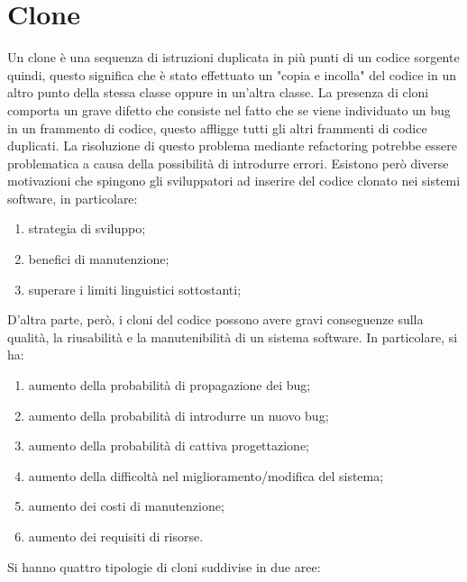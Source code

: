 \section{Clone}
Un clone è una sequenza di istruzioni duplicata in più punti di un codice sorgente quindi, questo significa che è stato effettuato un "copia e incolla" del codice in un altro punto della stessa classe oppure in un'altra classe. La presenza di cloni comporta un grave difetto che consiste nel fatto che se viene individuato un bug in un frammento di codice, questo affligge tutti gli altri frammenti di codice duplicati. La risoluzione di questo problema mediante refactoring potrebbe essere problematica a causa della possibilità di introdurre errori. Esistono però diverse motivazioni che spingono gli sviluppatori ad inserire del codice clonato nei sistemi software, in particolare:
\begin{enumerate}
\item	strategia di sviluppo;
\item	benefici di manutenzione;
\item	superare i limiti linguistici sottostanti;
\end{enumerate}
D'altra parte, però, i cloni del codice possono avere gravi conseguenze sulla qualità, la riusabilità e la manutenibilità di un sistema software. In particolare, si ha:
\begin{enumerate}
\item	aumento della probabilità di propagazione dei bug;
\item	aumento della probabilità di introdurre un nuovo bug;
\item	aumento della probabilità di cattiva progettazione;
\item	aumento della difficoltà nel miglioramento/modifica del sistema;
\item	aumento dei costi di manutenzione;
\item	aumento dei requisiti di risorse.
\end{enumerate}
Si hanno quattro tipologie di cloni suddivise in due aree:
